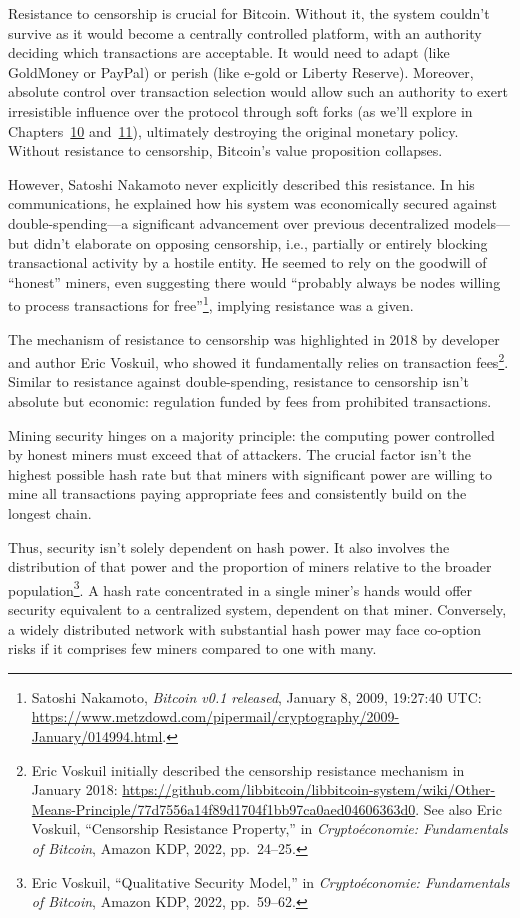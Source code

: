 \documentclass[
  a5paper,
  smalldemyvopaper,10pt,twoside,onecolumn,openright,extrafontsizes,hidelinks]{memoir}
\begin{document}
Resistance to censorship is crucial for Bitcoin. Without it, the system
couldn't survive as it would become a centrally controlled platform,
with an authority deciding which transactions are acceptable. It would
need to adapt (like GoldMoney or PayPal) or perish (like e-gold or
Liberty Reserve). Moreover, absolute control over transaction selection
would allow such an authority to exert irresistible influence over the
protocol through soft forks (as we'll explore in
Chapters~\hyperref[ch:changement]{10}
and~\hyperref[ch:determination]{11}), ultimately destroying the original
monetary policy. Without resistance to censorship, Bitcoin's value
proposition collapses.

However, Satoshi Nakamoto never explicitly described this resistance. In
his communications, he explained how his system was economically secured
against double-spending---a significant advancement over previous
decentralized models---but didn't elaborate on opposing censorship,
i.e., partially or entirely blocking transactional activity by a hostile
entity. He seemed to rely on the goodwill of ``honest'' miners, even
suggesting there would ``probably always be nodes willing to process
transactions for free''\footnote{Satoshi Nakamoto, \emph{Bitcoin v0.1
  released}, January 8, 2009, 19:27:40 UTC:
  \url{https://www.metzdowd.com/pipermail/cryptography/2009-January/014994.html}.},
implying resistance was a given.

The mechanism of resistance to censorship was highlighted in 2018 by
developer and author Eric Voskuil, who showed it fundamentally relies on
transaction fees\footnote{Eric Voskuil initially described the
  censorship resistance mechanism in January 2018:
  \url{https://github.com/libbitcoin/libbitcoin-system/wiki/Other-Means-Principle/77d7556a14f89d1704f1bb97ca0aed04606363d0}.
  See also Eric Voskuil, ``Censorship Resistance Property,'' in
  \emph{Cryptoéconomie: Fundamentals of Bitcoin}, Amazon KDP, 2022,
  pp.~24--25.}. Similar to resistance against double-spending,
resistance to censorship isn't absolute but economic: regulation funded
by fees from prohibited transactions.

Mining security hinges on a majority principle: the computing power
controlled by honest miners must exceed that of attackers. The crucial
factor isn't the highest possible hash rate but that miners with
significant power are willing to mine all transactions paying
appropriate fees and consistently build on the longest chain.

Thus, security isn't solely dependent on hash power. It also involves
the distribution of that power and the proportion of miners relative to
the broader population\footnote{Eric Voskuil, ``Qualitative Security
  Model,'' in \emph{Cryptoéconomie: Fundamentals of Bitcoin}, Amazon
  KDP, 2022, pp.~59--62.}. A hash rate concentrated in a single miner's
hands would offer security equivalent to a centralized system, dependent
on that miner. Conversely, a widely distributed network with substantial
hash power may face co-option risks if it comprises few miners compared
to one with many.
\end{document}
